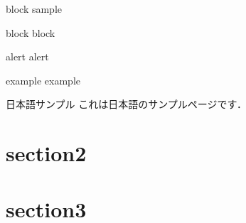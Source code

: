 \documentclass[aspectratio=1610,14pt]{beamer}
\begin{document}
\begin{frame}{block sample}
    \begin{block}{block}
        block
    \end{block}
    \begin{alertblock}{alert}
        alert
    \end{alertblock}
    \begin{exampleblock}{example}
        example
    \end{exampleblock}
\end{frame}

\begin{frame}{日本語サンプル}
    これは日本語のサンプルページです．
\end{frame}

\section{section2}

\begin{frame}
    \tableofcontents[currentsection]
\end{frame}
%
\section{section3}

\begin{frame}
    \tableofcontents[currentsection]
\end{frame}
%
%
%
%
\end{document}
